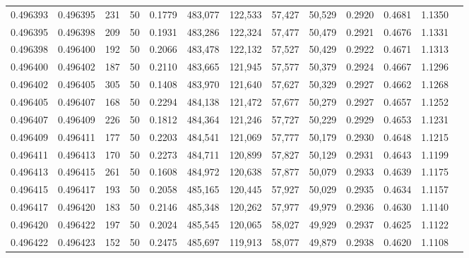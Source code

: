 \begin{tabular}{rrrrrrrrrrrrr}
0.496393 & 0.496395 &   231 &  50 &                                     0.1779 & 483,077 & 122,533 &  57,427 &  50,529 & 0.2920 & 0.4681 & 1.1350 \\
0.496395 & 0.496398 &   209 &  50 &                                     0.1931 & 483,286 & 122,324 &  57,477 &  50,479 & 0.2921 & 0.4676 & 1.1331 \\
0.496398 & 0.496400 &   192 &  50 &                                     0.2066 & 483,478 & 122,132 &  57,527 &  50,429 & 0.2922 & 0.4671 & 1.1313 \\
0.496400 & 0.496402 &   187 &  50 &                                     0.2110 & 483,665 & 121,945 &  57,577 &  50,379 & 0.2924 & 0.4667 & 1.1296 \\
0.496402 & 0.496405 &   305 &  50 &                                     0.1408 & 483,970 & 121,640 &  57,627 &  50,329 & 0.2927 & 0.4662 & 1.1268 \\
0.496405 & 0.496407 &   168 &  50 &                                     0.2294 & 484,138 & 121,472 &  57,677 &  50,279 & 0.2927 & 0.4657 & 1.1252 \\
0.496407 & 0.496409 &   226 &  50 &                                     0.1812 & 484,364 & 121,246 &  57,727 &  50,229 & 0.2929 & 0.4653 & 1.1231 \\
0.496409 & 0.496411 &   177 &  50 &                                     0.2203 & 484,541 & 121,069 &  57,777 &  50,179 & 0.2930 & 0.4648 & 1.1215 \\
0.496411 & 0.496413 &   170 &  50 &                                     0.2273 & 484,711 & 120,899 &  57,827 &  50,129 & 0.2931 & 0.4643 & 1.1199 \\
0.496413 & 0.496415 &   261 &  50 &                                     0.1608 & 484,972 & 120,638 &  57,877 &  50,079 & 0.2933 & 0.4639 & 1.1175 \\
0.496415 & 0.496417 &   193 &  50 &                                     0.2058 & 485,165 & 120,445 &  57,927 &  50,029 & 0.2935 & 0.4634 & 1.1157 \\
0.496417 & 0.496420 &   183 &  50 &                                     0.2146 & 485,348 & 120,262 &  57,977 &  49,979 & 0.2936 & 0.4630 & 1.1140 \\
0.496420 & 0.496422 &   197 &  50 &                                     0.2024 & 485,545 & 120,065 &  58,027 &  49,929 & 0.2937 & 0.4625 & 1.1122 \\
0.496422 & 0.496423 &   152 &  50 &                                     0.2475 & 485,697 & 119,913 &  58,077 &  49,879 & 0.2938 & 0.4620 & 1.1108 \\

\end{tabular}
